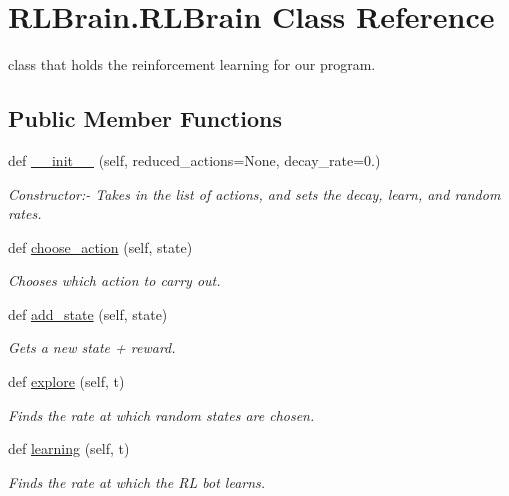 \hypertarget{classRLBrain_1_1RLBrain}{}\section{R\+L\+Brain.\+R\+L\+Brain Class Reference}
\label{classRLBrain_1_1RLBrain}


class that holds the reinforcement learning for our program.  


\subsection*{Public Member Functions}
\begin{DoxyCompactItemize}
\item 
def \hyperlink{classRLBrain_1_1RLBrain_a40f979542aaadb4826a1b6ab8cb76fa9}{\+\_\+\+\_\+init\+\_\+\+\_\+} (self, reduced\+\_\+actions=None, decay\+\_\+rate=0.)
\begin{DoxyCompactList}\small\item\em Constructor\+:-\/ Takes in the list of actions, and sets the decay, learn, and random rates. \end{DoxyCompactList}\item 
def \hyperlink{classRLBrain_1_1RLBrain_a64d74e364a6d9fb49b888363dbd9f922}{choose\+\_\+action} (self, state)
\begin{DoxyCompactList}\small\item\em Chooses which action to carry out. \end{DoxyCompactList}\item 
def \hyperlink{classRLBrain_1_1RLBrain_af39e6aad4cc89b805c6cb09877db1e09}{add\+\_\+state} (self, state)
\begin{DoxyCompactList}\small\item\em Gets a new state + reward. \end{DoxyCompactList}\item 
def \hyperlink{classRLBrain_1_1RLBrain_a2cdec6a8eb09e6bb0f5c24251659ed56}{explore} (self, t)
\begin{DoxyCompactList}\small\item\em Finds the rate at which random states are chosen. \end{DoxyCompactList}\item 
def \hyperlink{classRLBrain_1_1RLBrain_a5cd8667073eafe18d7e9a42cda61606d}{learning} (self, t)
\begin{DoxyCompactList}\small\item\em Finds the rate at which the RL bot learns. \end{DoxyCompactList}\item 

\end{DoxyCompactItemize}
